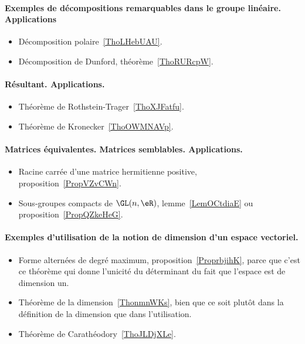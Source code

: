 \paragraph{Exemples de décompositions remarquables dans le groupe linéaire. Applications}
\begin{itemize}
    \item Décomposition polaire~\ref{ThoLHebUAU}.
    \item Décomposition de Dunford, théorème~\ref{ThoRURcpW}.
\end{itemize}
\paragraph{Résultant. Applications.}
\begin{itemize}
    \item Théorème de Rothstein-Trager~\ref{ThoXJFatfu}.
    \item Théorème de Kronecker~\ref{ThoOWMNAVp}.
\end{itemize}
\paragraph{Matrices équivalentes. Matrices semblables. Applications.}
\begin{itemize}
    \item Racine carrée d'une matrice hermitienne positive, proposition~\ref{PropVZvCWn}.
    \item Sous-groupes compacts de \( \GL(n,\eR)\), lemme~\ref{LemOCtdiaE} ou proposition~\ref{PropQZkeHeG}.
\end{itemize}
\paragraph{Exemples d'utilisation de la notion de dimension d'un espace vectoriel.}
\begin{itemize}
    \item Forme alternées de degré maximum, proposition~\ref{ProprbjihK}, parce que c'est ce théorème qui donne l'unicité du déterminant du fait que l'espace est de dimension un.
    \item Théorème de la dimension~\ref{ThonmnWKs}, bien que ce soit plutôt dans la définition de la dimension que dans l'utilisation.
    \item Théorème de Carathéodory~\ref{ThoJLDjXLe}.
\end{itemize}

